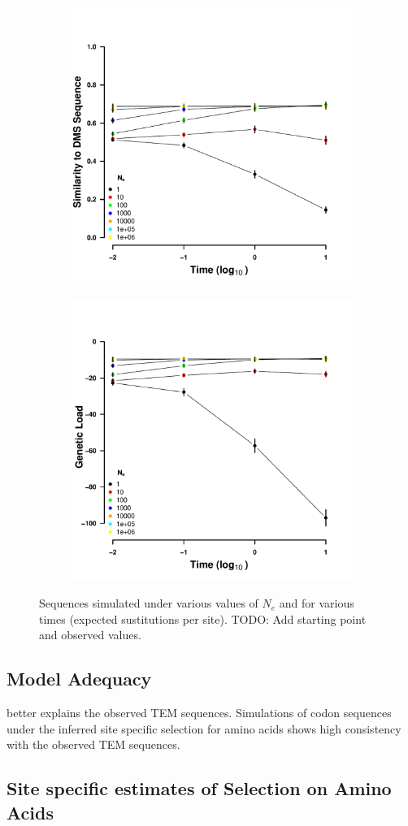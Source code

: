 \documentclass[12pt]{article}
\begin{document}
\begin{figure}[h]
    \centering
    \begin{subfigure}
        \centering
        \includegraphics[width=.45\textwidth]{img/simulated_dist_time.pdf}
    \end{subfigure}
    \begin{subfigure}
        \centering
        \includegraphics[width=.45\textwidth]{img/simulated_gl_time.pdf}
    \end{subfigure}
    \caption{Sequences simulated under various values of $N_e$ and for various times (expected sustitutions per site). TODO: Add starting point and observed values.}
    \label{fig:dms_sim}
\end{figure}

\subsection*{\selac Model Adequacy}
\selac better explains the observed TEM sequences.
Simulations of codon sequences under the \selac inferred site specific selection for amino acids shows high consistency with the observed TEM sequences.

\subsection*{Site specific estimates of Selection on Amino Acids}
\end{document}
